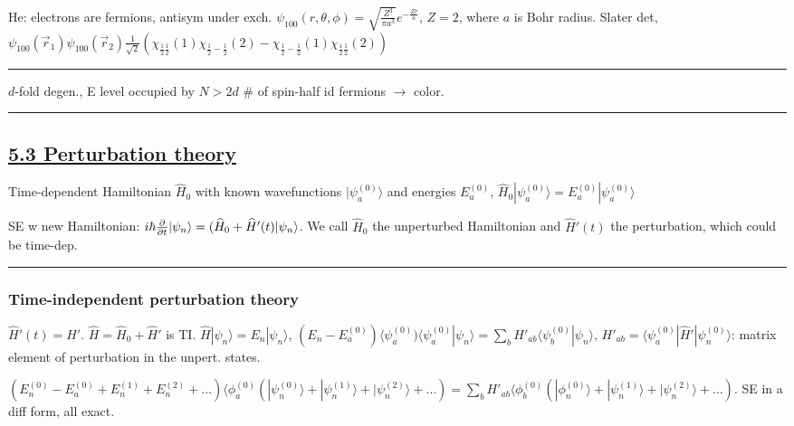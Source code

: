 \tiny
He: electrons are fermions, antisym under exch. $\psi_{100}(r, \theta, \phi) = \sqrt{\frac{Z^3}{\pi a^3}} e^{-\frac{Zr}{a}}$, $Z=2$, where $a$ is Bohr radius. Slater det, $\psi_{100}(\vec{r}_1) \psi_{100}(\vec{r}_2) \frac{1}{\sqrt{2}} (\chi_{\frac{1}{2} \frac{1}{2}} (1) \chi_{\frac{1}{2} -\frac{1}{2}} (2) - \chi_{\frac{1}{2} -\frac{1}{2}}(1) \chi_{\frac{1}{2} \frac{1}{2}} (2))$

\scriptsize

\hrule height 0.07pt

$d$-fold degen., E level occupied by $N > 2d$ \# of spin-half id fermions $\rightarrow$ color.

\hrule height 0.07pt

\subsection{\underline{5.3 Perturbation theory}}

Time-dependent Hamiltonian $\widehat{H}_0$ with known wavefunctions $|\psi_a^{(0)}\rangle$ and energies $E_a^{(0)}$, $\widehat{H}_0 |\psi_a^{(0)} \rangle = E_a^{(0)} | \psi_a^{(0)} \rangle$

SE w new Hamiltonian: $i \hbar \pdv{}{t} | \psi_n \rangle = (\widehat{H}_0 + \widehat{H}'(t) | \psi_n \rangle$. We call $\widehat{H}_0$ the unperturbed Hamiltonian and $\widehat{H}'(t)$ the perturbation, which could be time-dep.

\hrule height 0.07pt

\subsubsection{Time-independent perturbation theory}

$\widehat{H}'(t) = \widehat{H}'$. $\widehat{H} = \widehat{H}_0 + \widehat{H}'$ is TI. $\widehat{H} |\psi_n \rangle = E_n | \psi_n \rangle$, $(E_n - E_a^{(0)}) \langle \psi_a^{(0)}) \langle \psi_a^{(0)} | \psi_n \rangle = \sum_b H'_{ab} \langle \psi_b^{(0)} | \psi_n \rangle$, $H'_{ab} = \langle \psi_a^{(0)} | \widehat{H}' | \psi_n^{(0)} \rangle$: matrix element of perturbation in the unpert. states.

$(E_n^{(0)} - E_a^{(0)} + E_n^{(1)} + E_n^{(2)} + \dots) \langle \phi_a^{(0)} (|\psi_n^{(0)} \rangle + | \psi_n^{(1)}\rangle + | \psi_n^{(2)} \rangle + \dots) = \sum_b H'_{ab} \langle \phi_b^{(0)} (| \phi_n^{(0)} \rangle + | \psi_n^{(1)} \rangle + |\psi_n^{(2)} \rangle + \dots)$. SE in a diff form, all exact.

